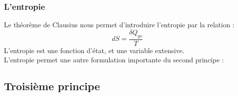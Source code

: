 \documentclass[12pt,oneside]{book}
\begin{document}
\subsubsection{L'entropie}
Le théorème de Clausius nous permet d'introduire l'entropie par la relation :
\[\boxed{ dS = \frac{\delta Q_{qs}}{T} }\]
L'entropie est une fonction d'état, et une variable extensive.\\
L'entropie permet une autre formulation importante du second principe :
\begin{center}\end{center}
\subsection{Troisième principe}
\begin{center}\end{center}
\end{document}
